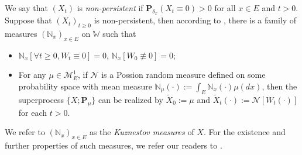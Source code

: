 \documentclass[12pt, a4paper]{amsart}
\theoremstyle{definition}
\numberwithin{equation}{section}
\begin{document}
	We say that $(X_t)$ is \emph{non-persistent}
	if $\mathbf P_{\delta_x}(X_t \equiv 0) > 0$ for all $x\in E$ and $t> 0$.
	Suppose that $(X_t)_{t\geq 0}$ is non-persistent,
	then according to \cite[Section 8]{Li2011Measure-valued}, there is a family of measures $(\mathbb N_x)_{x\in E}$ on $\mathbb W$ such that
\begin{itemize}
	\item
	$\mathbb N_x [ \forall t \geq 0, W_t \equiv 0] =0$, $\mathbb N_x[W_0 \not\equiv 0] = 0$;
	\item
	For any $\mu \in \mathcal M_E^1$, if $\mathcal N$ is a Possion random 
	measure defined on some
	probability space with mean measure $\mathbb N_\mu(\cdot):= \int_E \mathbb N_x(\cdot )\mu(dx)$,
	then the superprocess $\{X;\mathbf P_\mu\}$ can be realized by $\tilde X_0 := \mu$ and $\tilde X_t(\cdot) := \mathcal N[W_t(\cdot)]$ for each $t>0$.
\end{itemize}
	We refer to $(\mathbb N_x)_{x\in E}$ as the \emph{Kuznestov measures} of $X$.
	For the existence and further properties of such measures, we refer our readers to \cite{Li2011Measure-valued}.
	
\end{document}
